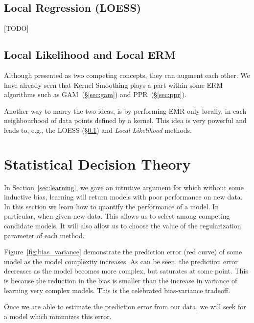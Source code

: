 \documentclass[12pt,a4paper]{article}
\theoremstyle{plain}
\theoremstyle{definition}
\begin{document}
\subsection{Local Regression (LOESS)}
\label{sec:loess}
[TODO]



\subsection{Local Likelihood and Local ERM}
Although presented as two competing concepts, they can augment each other. 
We have already seen that Kernel Smoothing plays a part within some ERM algorithms such as GAM~(\S\ref{sec:gam}) and PPR~(\S \ref{sec:ppr}).

Another way to marry the two ideas, is by performing EMR only locally, in each neighbourhood of data points defined by a kernel. This idea is very powerful and leads to, e.g., the LOESS (\S \ref{sec:loess}) and \emph{Local Likelihood} methods.



\section{Statistical Decision Theory}
\label{sec:desicion_theory}


In Section~\ref{sec:learning}, we gave an intuitive argument for which without some inductive bias, learning will return models with poor performance on new data.
In this section we learn how to quantify the performance of a model. In particular, when given new data. This allows us to select among competing candidate models. It will also allow us to choose the value of the regularization parameter of each method.

Figure~\ref{fig:bias_variance} demonstrate the prediction error (red curve) of some model as the model complexity increases. As can be seen, the prediction error decreases as the model becomes more complex, but saturates at some point. 
This is because the reduction in the bias is smaller than the increase in variance of learning very complex models.
This is the celebrated bias-variance tradeoff.

Once we are able to estimate the prediction error from our data, we will seek for a model which minimizes this error.
\end{document}
